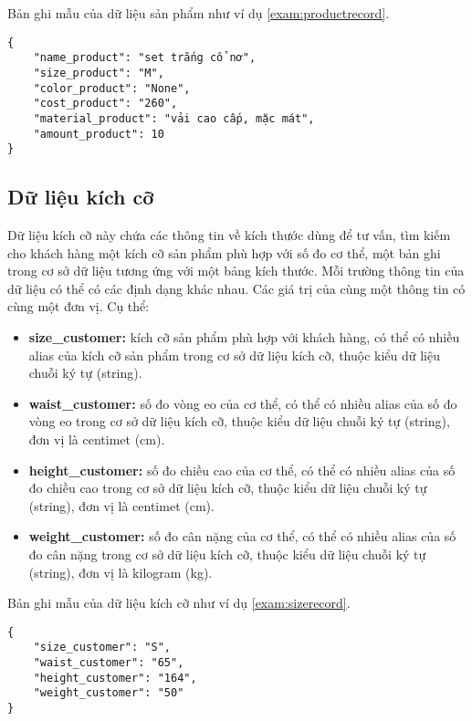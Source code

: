 Bản ghi mẫu của dữ liệu sản phẩm như ví dụ \ref{exam:productrecord}.

\renewcommand{\lstlistingname}{Ví dụ}
\begin{lstlisting}[caption={Một bản ghi của dữ liệu sản phẩm},label={exam:productrecord},language=code_vn,firstnumber=1]
{
    "name_product": "set trắng cổ nơ",
    "size_product": "M",
    "color_product": "None",
    "cost_product": "260",
    "material_product": "vải cao cấp, mặc mát",
    "amount_product": 10
}
\end{lstlisting}

\subsection{Dữ liệu kích cỡ}
\label{subsec:sizedb}
Dữ liệu kích cỡ này chứa các thông tin về kích thước dùng để tư vấn, tìm kiếm cho khách hàng một kích cỡ sản phẩm phù hợp với số đo cơ thể, một bản ghi trong cơ sở dữ liệu tương ứng với một bảng kích thước. Mỗi trường thông tin của dữ liệu có thể có các định dạng khác nhau. Các giá trị của cùng một thông tin có cùng một đơn vị. Cụ thể:

\begin{itemize}
    \item \textbf{size\_customer:} kích cỡ sản phẩm phù hợp với khách hàng, có thể có nhiều alias của kích cỡ sản phẩm trong cơ sở dữ liệu kích cỡ, thuộc kiểu dữ liệu chuỗi ký tự (string).
    \item \textbf{waist\_customer:} số đo vòng eo của cơ thể, có thể có nhiều alias của số đo vòng eo trong cơ sở dữ liệu kích cỡ, thuộc kiểu dữ liệu chuỗi ký tự (string), đơn vị là centimet (cm).
    \item \textbf{height\_customer:} số đo chiều cao của cơ thể, có thể có nhiều alias của số đo chiều cao trong cơ sở dữ liệu kích cỡ, thuộc kiểu dữ liệu chuỗi ký tự (string), đơn vị là centimet (cm).
    \item \textbf{weight\_customer:} số đo cân nặng của cơ thể, có thể có nhiều alias của số đo cân nặng trong cơ sở dữ liệu kích cỡ, thuộc kiểu dữ liệu chuỗi ký tự (string), đơn vị là kilogram (kg).
\end{itemize}

Bản ghi mẫu của dữ liệu kích cỡ như ví dụ \ref{exam:sizerecord}.

\renewcommand{\lstlistingname}{Ví dụ}
\begin{lstlisting}[caption={Một bản ghi của dữ liệu kích cỡ},label={exam:sizerecord},language=code_vn,firstnumber=1]
{
    "size_customer": "S",
    "waist_customer": "65",
    "height_customer": "164",
    "weight_customer": "50"
}
\end{lstlisting}

